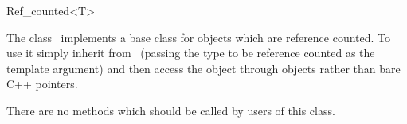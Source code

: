 

\begin{ccRefClass}{Ref_counted<T>}  %


\ccDefinition
  
The class \ccRefName\ implements a base class for objects which are
reference counted. To use it simply inherit from \ccRefName\ (passing
the type to be reference counted as the template argument) and then
access the object through  objects rather than bare C++
pointers.



\ccTypes


\ccCreation
{}  %


\ccOperations

There are no methods which should be called by users of this class.

\end{ccRefClass}


